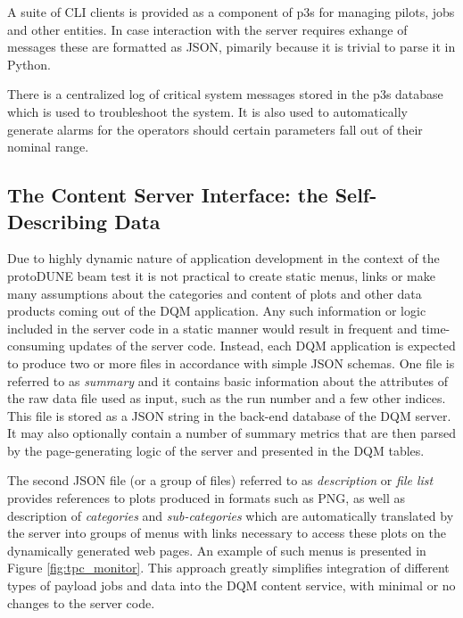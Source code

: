 \documentclass{webofc}
\newcommand{\pd}{protoDUNE\xspace}
\begin{document}
 A suite of CLI clients is provided as a component of p3s for managing pilots, jobs and
other entities. In case interaction with the server requires exhange of messages these are
formatted as JSON, pimarily because it is trivial to parse it in Python.

There is a centralized log of critical system messages stored in the p3s database which
is used to troubleshoot the system. It is also used to automatically generate alarms
for the operators should certain parameters fall out of their nominal range.

\subsection{The Content Server Interface: the Self-Describing Data}
Due to highly dynamic nature of application development in the context of the \pd beam
test it is not practical to create static menus, links or make many assumptions about
the categories and content of plots and other data products coming out of the DQM
application. Any such information or logic included in the server code in a static manner
would result in frequent and time-consuming updates of the server code. Instead,
each DQM application is expected to produce two or more files in accordance
with simple JSON schemas. One file is referred to as \textit{summary} and it contains basic
information about the attributes of the raw data file used as input, such as the run number
and a few other indices. This file is stored as a JSON string in the back-end database
of the DQM server. It may also optionally contain a number of summary metrics
that are then parsed by the page-generating logic of the server and presented
in the DQM tables.

The second JSON file (or a group of files) referred to as \textit{description} or \textit{file list}
provides references to plots produced in formats such as PNG, as well as description of
\textit{categories} and \textit{sub-categories} which are automatically translated by the server into
groups of menus with links necessary to access these plots on the dynamically generated
web pages. An example of such menus is presented in Figure \ref{fig:tpc_monitor}.
This approach greatly simplifies integration of different types of payload jobs 
and data into the DQM content service, with minimal or no changes to the
server code.
\end{document}
